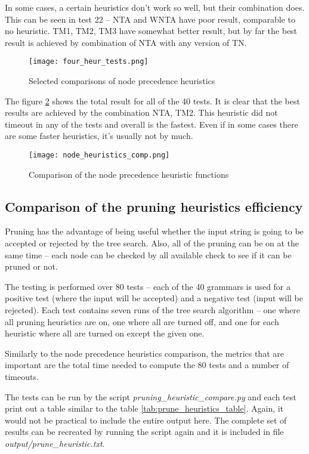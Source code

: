 In some cases, a certain heuristics don't work so well, but their combination does. This can be seen in test 22 -- NTA and WNTA have poor result, comparable to no heuristic. TM1, TM2, TM3 have somewhat better result, but by far the best result is achieved by combination of NTA with any version of TN.

\begin{figure}[h]
  \texttt{[image: four\_heur\_tests.png]}
  \caption{Selected comparisons of node precedence heuristics}
  \label{fig:selected_tests}
\end{figure}

The figure \ref{fig:node_heuristics_comp} shows the total result for all of the 40 tests. It is clear that the best results are achieved by the combination NTA, TM2. This heuristic did not timeout in any of the tests and overall is the fastest. Even if in some cases there are some faster heuristics, it's usually not by much.

\begin{figure}[h]
  \texttt{[image: node\_heuristics\_comp.png]}
  \caption{Comparison of the node precedence heuristic functions}
  \label{fig:node_heuristics_comp}
\end{figure}

\subsection{Comparison of the pruning heuristics efficiency}

Pruning has the advantage of being useful whether the input string is going to be accepted or rejected by the tree search. Also, all of the pruning can be on at the same time -- each node can be checked by all available check to see if it can be pruned or not.

The testing is performed over 80 tests -- each of the 40 grammars is used for a positive test (where the input will be accepted) and a negative test (input will be rejected).
Each test contains seven runs of the tree search algorithm -- one where all pruning heuristics are on, one where all are turned off, and one for each heuristic where all are turned on except the given one.

Similarly to the node precedence heuristics comparison, the metrics that are important are the total time needed to compute the 80 tests and a number of timeouts.

The tests can be run by the script \textit{pruning\_heuristic\_compare.py} and each test print out a table similar to the table \ref{tab:prune_heuristics_table}. Again, it would not be practical to include the entire output here. The complete set of results can be recreated by running the script again and it is included in file \textit{output/prune\_heuristic.txt}.

